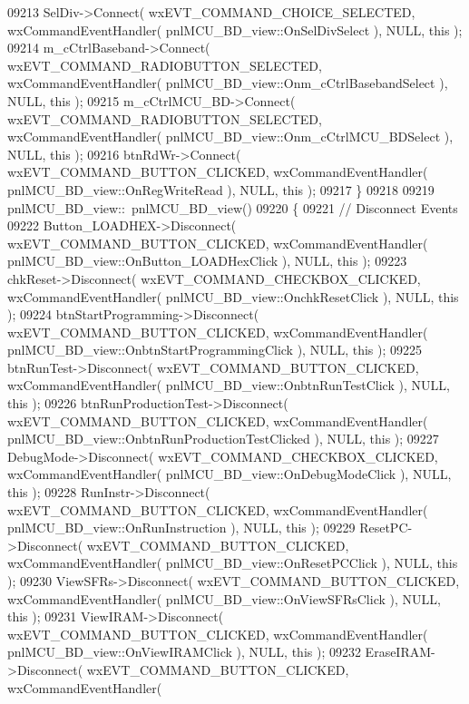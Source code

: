 \begin{DoxyCode}
09213     SelDiv->Connect( wxEVT\_COMMAND\_CHOICE\_SELECTED, wxCommandEventHandler( 
      pnlMCU_BD_view::OnSelDivSelect ), NULL, \textcolor{keyword}{this} );
09214     m_cCtrlBaseband->Connect( wxEVT\_COMMAND\_RADIOBUTTON\_SELECTED, wxCommandEventHandler( 
      pnlMCU_BD_view::Onm_cCtrlBasebandSelect ), NULL, \textcolor{keyword}{this} );
09215     m_cCtrlMCU_BD->Connect( wxEVT\_COMMAND\_RADIOBUTTON\_SELECTED, wxCommandEventHandler( 
      pnlMCU_BD_view::Onm_cCtrlMCU_BDSelect ), NULL, \textcolor{keyword}{this} );
09216     btnRdWr->Connect( wxEVT\_COMMAND\_BUTTON\_CLICKED, wxCommandEventHandler( 
      pnlMCU_BD_view::OnRegWriteRead ), NULL, \textcolor{keyword}{this} );
09217 \}
09218 
09219 pnlMCU_BD_view::~pnlMCU_BD_view()
09220 \{
09221     \textcolor{comment}{// Disconnect Events}
09222     Button_LOADHEX->Disconnect( wxEVT\_COMMAND\_BUTTON\_CLICKED, wxCommandEventHandler( 
      pnlMCU_BD_view::OnButton_LOADHexClick ), NULL, \textcolor{keyword}{this} );
09223     chkReset->Disconnect( wxEVT\_COMMAND\_CHECKBOX\_CLICKED, wxCommandEventHandler( 
      pnlMCU_BD_view::OnchkResetClick ), NULL, \textcolor{keyword}{this} );
09224     btnStartProgramming->Disconnect( wxEVT\_COMMAND\_BUTTON\_CLICKED, wxCommandEventHandler( 
      pnlMCU_BD_view::OnbtnStartProgrammingClick ), NULL, \textcolor{keyword}{this} );
09225     btnRunTest->Disconnect( wxEVT\_COMMAND\_BUTTON\_CLICKED, wxCommandEventHandler( 
      pnlMCU_BD_view::OnbtnRunTestClick ), NULL, \textcolor{keyword}{this} );
09226     btnRunProductionTest->Disconnect( wxEVT\_COMMAND\_BUTTON\_CLICKED, wxCommandEventHandler( 
      pnlMCU_BD_view::OnbtnRunProductionTestClicked ), NULL, \textcolor{keyword}{this} );
09227     DebugMode->Disconnect( wxEVT\_COMMAND\_CHECKBOX\_CLICKED, wxCommandEventHandler( 
      pnlMCU_BD_view::OnDebugModeClick ), NULL, \textcolor{keyword}{this} );
09228     RunInstr->Disconnect( wxEVT\_COMMAND\_BUTTON\_CLICKED, wxCommandEventHandler( 
      pnlMCU_BD_view::OnRunInstruction ), NULL, \textcolor{keyword}{this} );
09229     ResetPC->Disconnect( wxEVT\_COMMAND\_BUTTON\_CLICKED, wxCommandEventHandler( 
      pnlMCU_BD_view::OnResetPCClick ), NULL, \textcolor{keyword}{this} );
09230     ViewSFRs->Disconnect( wxEVT\_COMMAND\_BUTTON\_CLICKED, wxCommandEventHandler( 
      pnlMCU_BD_view::OnViewSFRsClick ), NULL, \textcolor{keyword}{this} );
09231     ViewIRAM->Disconnect( wxEVT\_COMMAND\_BUTTON\_CLICKED, wxCommandEventHandler( 
      pnlMCU_BD_view::OnViewIRAMClick ), NULL, \textcolor{keyword}{this} );
09232     EraseIRAM->Disconnect( wxEVT\_COMMAND\_BUTTON\_CLICKED, wxCommandEventHandler( 

\end{DoxyCode}
